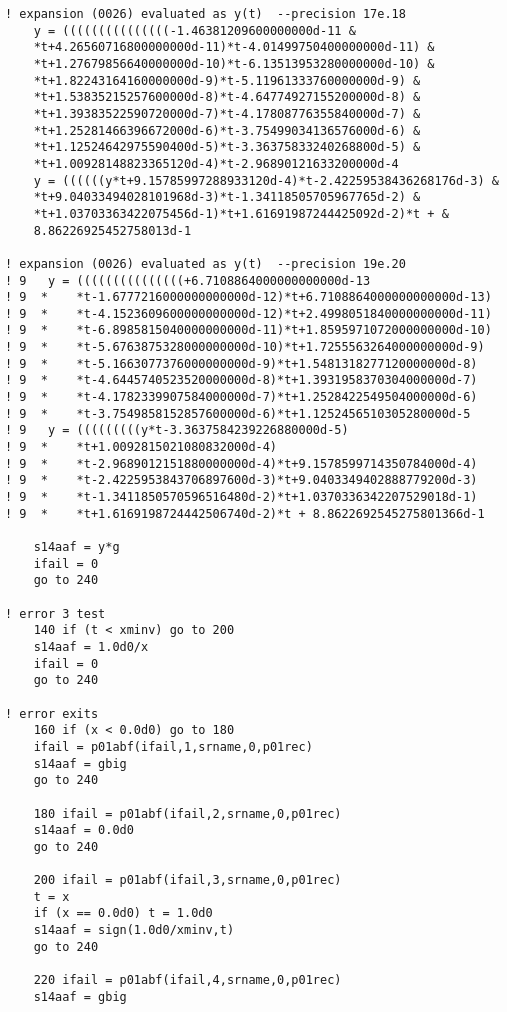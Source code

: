 \documentclass[12pt]{article}
\begin{document}
\begin{lstlisting}[frame=single,caption={{\tt d01b.f90}},label=d01b]
! expansion (0026) evaluated as y(t)  --precision 17e.18
    y = (((((((((((((((-1.46381209600000000d-11 &
    *t+4.26560716800000000d-11)*t-4.01499750400000000d-11) &
    *t+1.27679856640000000d-10)*t-6.13513953280000000d-10) &
    *t+1.82243164160000000d-9)*t-5.11961333760000000d-9) &
    *t+1.53835215257600000d-8)*t-4.64774927155200000d-8) &
    *t+1.39383522590720000d-7)*t-4.17808776355840000d-7) &
    *t+1.25281466396672000d-6)*t-3.75499034136576000d-6) &
    *t+1.12524642975590400d-5)*t-3.36375833240268800d-5) &
    *t+1.00928148823365120d-4)*t-2.96890121633200000d-4
    y = ((((((y*t+9.15785997288933120d-4)*t-2.42259538436268176d-3) &
    *t+9.04033494028101968d-3)*t-1.34118505705967765d-2) &
    *t+1.03703363422075456d-1)*t+1.61691987244425092d-2)*t + &
    8.86226925452758013d-1

! expansion (0026) evaluated as y(t)  --precision 19e.20
! 9   y = (((((((((((((((+6.7108864000000000000d-13
! 9  *    *t-1.6777216000000000000d-12)*t+6.7108864000000000000d-13)
! 9  *    *t-4.1523609600000000000d-12)*t+2.4998051840000000000d-11)
! 9  *    *t-6.8985815040000000000d-11)*t+1.8595971072000000000d-10)
! 9  *    *t-5.6763875328000000000d-10)*t+1.7255563264000000000d-9)
! 9  *    *t-5.1663077376000000000d-9)*t+1.5481318277120000000d-8)
! 9  *    *t-4.6445740523520000000d-8)*t+1.3931958370304000000d-7)
! 9  *    *t-4.1782339907584000000d-7)*t+1.2528422549504000000d-6)
! 9  *    *t-3.7549858152857600000d-6)*t+1.1252456510305280000d-5
! 9   y = (((((((((y*t-3.3637584239226880000d-5)
! 9  *    *t+1.0092815021080832000d-4)
! 9  *    *t-2.9689012151880000000d-4)*t+9.1578599714350784000d-4)
! 9  *    *t-2.4225953843706897600d-3)*t+9.0403349402888779200d-3)
! 9  *    *t-1.3411850570596516480d-2)*t+1.0370336342207529018d-1)
! 9  *    *t+1.6169198724442506740d-2)*t + 8.8622692545275801366d-1

    s14aaf = y*g
    ifail = 0
    go to 240

! error 3 test
    140 if (t < xminv) go to 200
    s14aaf = 1.0d0/x
    ifail = 0
    go to 240

! error exits
    160 if (x < 0.0d0) go to 180
    ifail = p01abf(ifail,1,srname,0,p01rec)
    s14aaf = gbig
    go to 240

    180 ifail = p01abf(ifail,2,srname,0,p01rec)
    s14aaf = 0.0d0
    go to 240

    200 ifail = p01abf(ifail,3,srname,0,p01rec)
    t = x
    if (x == 0.0d0) t = 1.0d0
    s14aaf = sign(1.0d0/xminv,t)
    go to 240

    220 ifail = p01abf(ifail,4,srname,0,p01rec)
    s14aaf = gbig


\end{lstlisting}
\end{document}
